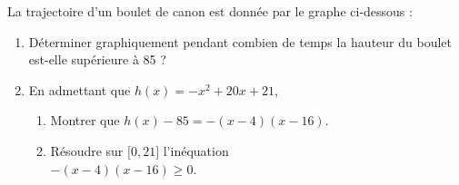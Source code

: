 
\begin{exercice}\label{exosmath-0662}

    La trajectoire d'un boulet de canon est donnée par le graphe ci-dessous :

\begin{center}
   
\end{center}

\begin{enumerate}
    \item
        Déterminer graphiquement pendant combien de temps la hauteur du boulet est-elle supérieure à \unit{85}{\meter} ?
    \item
        En admettant que \( h(x)=-x^2+20x+21\),
        \begin{enumerate}
            \item
                Montrer que \( h(x)-85=-(x-4)(x-16)\).
            \item
                Résoudre sur \( \mathopen[ 0 , 21 \mathclose]\) l'inéquation\\ \( -(x-4)(x-16)\geq 0\).
        \end{enumerate}
\end{enumerate}

\end{exercice}
